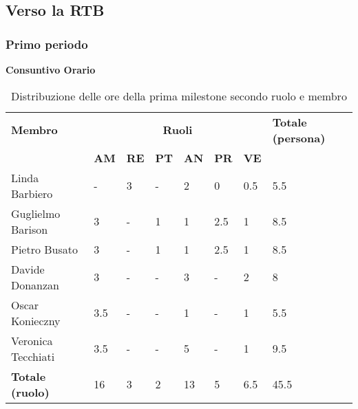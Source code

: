 \subsection{Verso la RTB}
\subsubsection{Primo periodo}
\textbf{Consuntivo Orario}
\\
\begin{table}[ht!]
	\centering
	\begin{tabular}{p{4cm} p{1cm} p{1cm} p{1cm} p{1cm} p{1cm} p{1cm} p{3cm}}
		\toprule
        \textbf{Membro} & \multicolumn{6}{c}{\textbf{Ruoli}} & \textbf{Totale (persona)}\\
		& \textbf{AM} & \textbf{RE} & \textbf{PT} & \textbf{AN} & \textbf{PR} & \textbf{VE}\\
		\midrule
        Linda Barbiero          & -     & 3     & -     & 2     & 0     & 0.5   & 5.5 \\
        Guglielmo Barison       & 3     & -     & 1     & 1     & 2.5   & 1     & 8.5\\
        Pietro Busato           & 3     & -     & 1     & 1     & 2.5   & 1     & 8.5 \\
        Davide Donanzan         & 3     & -     & -     & 3     & -     & 2     & 8 \\
        Oscar Konieczny         & 3.5   & -     & -     & 1     & -     & 1     & 5.5 \\
        Veronica Tecchiati      & 3.5   & -     & -     & 5     & -     & 1     & 9.5 \\
        \bottomrule
        \textbf{Totale (ruolo)} & 16    & 3     & 2     & 13   & 5     & 6.5   & 45.5 \\
	\end{tabular}
	\caption{Distribuzione delle ore della prima milestone secondo ruolo e membro}
	\label{table:Distribuzione delle ore consuntive della prima milestone secondo ruolo e membro}
\end{table}
\newpage
